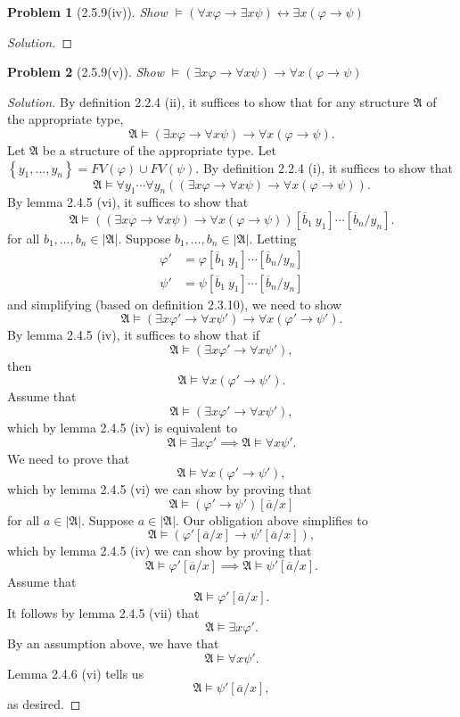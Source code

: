 \documentclass[letter]{article}
\newcommand{\abs}[1]{\left\lvert#1\right\rvert}
\newtheorem{problem}{Problem}
\theoremstyle{definition}
\newenvironment{solution}
{\begin{proof}[Solution]}
        {\end{proof}}
\renewcommand{\phi}{\varphi}
\newcommand*{\braces}[1]{\left\{#1\right\}}
\newcommand*{\bracks}[1]{\left\lbrack{#1}\right\rbrack}
\newcommand*{\parens}[1]{\left({#1}\right)}
\begin{document}
\begin{problem}[2.5.9(iv)]
    Show $\models (\forall x \phi \to \exists x \psi) \leftrightarrow \exists x (\phi \to \psi)$
\end{problem}
\begin{solution}
\end{solution}

\begin{problem}[2.5.9(v)]
    Show $\models (\exists x \phi \to \forall x \psi) \to \forall x (\phi \to \psi)$
\end{problem}
\begin{solution}
By definition 2.2.4 (ii), it suffices to show that
for any structure $\mathfrak A$ of the appropriate type,
\[\mathfrak A \models (\exists x \phi \to \forall x \psi) \to \forall x (\phi \to \psi).\]
Let $\mathfrak A$ be a structure of the appropriate type.
Let $\braces{y_1, \ldots, y_n} = FV(\phi) \cup FV(\psi)$.
By definition 2.2.4 (i), it suffices to show that
\[\mathfrak A \models \forall y_1 \cdots \forall y_n
  \parens{(\exists x \phi \to \forall x \psi) \to \forall x (\phi \to \psi)}.\]
By lemma 2.4.5 (vi), it suffices to show that
\[\mathfrak A \models \parens{(\exists x \phi \to \forall x \psi) \to \forall x (\phi \to \psi)}
  \bracks{\overline b_1 \ y_1} \cdots \bracks{\overline b_n / y_n}.\]
for all $b_1, \ldots, b_n \in \abs{\mathfrak A}$.
Suppose $b_1, \ldots, b_n \in \abs{\mathfrak A}$.
Letting
\begin{align*}
\phi' &= \phi \bracks{\overline b_1 \ y_1} \cdots \bracks{\overline b_n / y_n} \\
\psi' &= \psi \bracks{\overline b_1 \ y_1} \cdots \bracks{\overline b_n / y_n}
\end{align*}
and simplifying (based on definition 2.3.10), we need to show
\[\mathfrak A \models (\exists x \phi' \to \forall x \psi') \to \forall x (\phi' \to \psi').\]
By lemma 2.4.5 (iv), it suffices to show that if
\[\mathfrak A \models (\exists x \phi' \to \forall x \psi'),\]
then
\[\mathfrak A \models \forall x (\phi' \to \psi').\]
Assume that
\[\mathfrak A \models (\exists x \phi' \to \forall x \psi'),\]
which by lemma 2.4.5 (iv) is equivalent to
\[\mathfrak A \models \exists x \phi' \implies \mathfrak A \models \forall x \psi'.\]
We need to prove that
\[\mathfrak A \models \forall x (\phi' \to \psi'),\]
which by lemma 2.4.5 (vi) we can show by proving that
\[\mathfrak A \models (\phi' \to \psi') \bracks{\overline a / x}\]
for all $a \in \abs{\mathfrak A}$.
Suppose $a \in \abs{\mathfrak A}$.
Our obligation above simplifies to
\[\mathfrak A \models (\phi' \bracks{\overline a / x} \to \psi' \bracks{\overline a / x}),\]
which by lemma 2.4.5 (iv) we can show by proving that
\[\mathfrak A \models \phi' \bracks{\overline a / x} \implies
  \mathfrak A \models \psi' \bracks{\overline a / x}.\]
Assume that
\[\mathfrak A \models \phi' \bracks{\overline a / x}.\]
It follows by lemma 2.4.5 (vii) that
\[\mathfrak A \models \exists x \phi'.\]
By an assumption above, we have that
\[\mathfrak A \models \forall x \psi'.\]
Lemma 2.4.6 (vi) tells us
\[\mathfrak A \models \psi' \bracks{\overline a / x},\]
as desired.
\end{solution}
\end{document}
